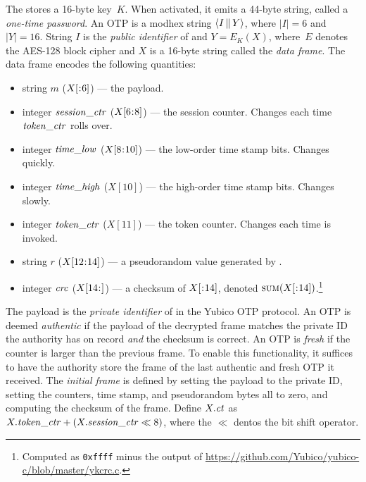 The \key stores a 16-byte key~$K$. When activated, it emits a 44-byte string,
called a \emph{one-time password}.
%
An OTP is a modhex string $\str(I \cat Y)$, where $|I|=6$ and $|Y|=16$.
%
String $I$ is the \emph{public identifier} of \key and $Y=E_K(X)$, where~$E$ denotes the
AES-128 block cipher and $X$ is a 16-byte string called the \emph{data frame}.
The data frame encodes the following quantities:
\begin{itemize}
  \item string $m$ ($\substr(X,,6)$) --- the payload.
  \item integer $\mathit{session\_ctr}$ ($\substr(X,6,8)$) --- the session counter.
    Changes each time $\mathit{token\_ctr}$ rolls over.
  \item integer $\mathit{time\_low}$ ($\substr(X,8,10)$) --- the low-order time stamp
    bits. Changes quickly.
  \item integer $\mathit{time\_high}$ ($X[10]$) --- the high-order time stamp
    bits. Changes slowly.
  \item integer $\mathit{token\_ctr}$ ($X[11]$) --- the token counter. Changes each
    time \key is invoked.
  \item string $r$ ($\substr(X,12,14)$) --- a pseudorandom value generated by
    \key. 
  \item integer $\mathit{crc}$ ($\substr(X,14,)$) --- a checksum of
    $\substr(X,,14)$, denoted $\checksum(\substr(X,,14))$.\footnote{Computed as \texttt{0xffff} minus the output of
    \url{https://github.com/Yubico/yubico-c/blob/master/ykcrc.c}.}
\end{itemize}
The payload is the \emph{private identifier} of \key in the Yubico OTP protocol.
%
An OTP is deemed \emph{authentic} if the payload of the decrypted frame matches
the private ID the authority has on record \emph{and} the checksum is correct.
An OTP is \emph{fresh} if the counter is larger than the previous frame. To
enable this functionality, it suffices to have the authority store the frame of
the last authentic and fresh OTP it received. The \emph{initial frame} is
defined by setting the payload to the private ID, setting the counters, time
stamp, and pseudorandom bytes all to zero, and computing the checksum of the
frame.
%
Define $X.\mathit{ct}$ as $X.\mathit{token\_ctr} + (X.\mathit{session\_ctr} \ll 8)$, where the $\ll$ dentos the bit
shift operator.

